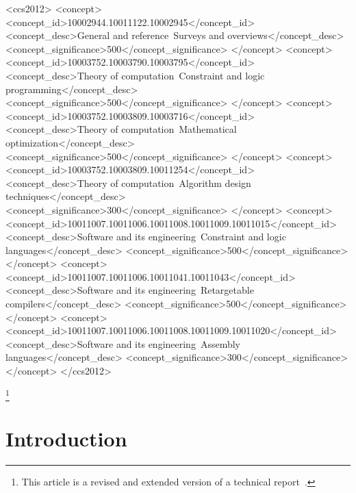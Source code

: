 \documentclass[acmsmall,authorversion,nonacm]{acmart}
\begin{document}
\begin{CCSXML}
<ccs2012>
<concept>
<concept_id>10002944.10011122.10002945</concept_id>
<concept_desc>General and reference~Surveys and overviews</concept_desc>
<concept_significance>500</concept_significance>
</concept>
<concept>
<concept_id>10003752.10003790.10003795</concept_id>
<concept_desc>Theory of computation~Constraint and logic programming</concept_desc>
<concept_significance>500</concept_significance>
</concept>
<concept>
<concept_id>10003752.10003809.10003716</concept_id>
<concept_desc>Theory of computation~Mathematical optimization</concept_desc>
<concept_significance>500</concept_significance>
</concept>
<concept>
<concept_id>10003752.10003809.10011254</concept_id>
<concept_desc>Theory of computation~Algorithm design techniques</concept_desc>
<concept_significance>300</concept_significance>
</concept>
<concept>
<concept_id>10011007.10011006.10011008.10011009.10011015</concept_id>
<concept_desc>Software and its engineering~Constraint and logic languages</concept_desc>
<concept_significance>500</concept_significance>
</concept>
<concept>
<concept_id>10011007.10011006.10011041.10011043</concept_id>
<concept_desc>Software and its engineering~Retargetable compilers</concept_desc>
<concept_significance>500</concept_significance>
</concept>
<concept>
<concept_id>10011007.10011006.10011008.10011009.10011020</concept_id>
<concept_desc>Software and its engineering~Assembly languages</concept_desc>
<concept_significance>300</concept_significance>
</concept>
</ccs2012>
\end{CCSXML}






\thanks{This article is a revised and extended version of a technical
report~\cite{Castaneda2014b}.}

\maketitle

\section{Introduction}\label{sec:introduction}
\end{document}
